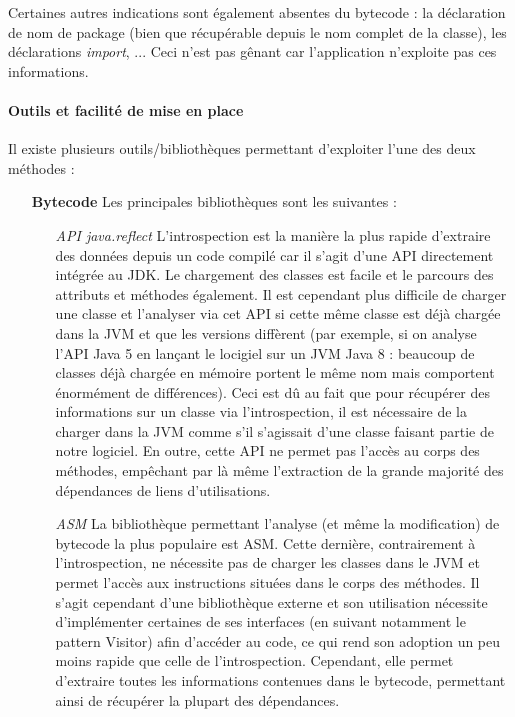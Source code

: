 \documentclass{scrartcl}
\begin{document}
    Certaines autres indications sont également absentes du bytecode : la déclaration de nom de package (bien que récupérable depuis le nom complet de la classe), les déclarations \textit{import}, ... Ceci n'est pas gênant car l'application n'exploite pas ces informations.
    
    \paragraph{Outils et facilité de mise en place} Il existe plusieurs outils/bibliothèques permettant d'exploiter l'une des deux méthodes :
        \bigbreak
        \begin{itemize}
            \item[\textbf{Bytecode}] Les principales bibliothèques sont les suivantes :
            \begin{itemize}
                \smallbreak
                \item[\textit{API java.reflect}] L'introspection est la manière la plus rapide d'extraire des données depuis un code compilé car il s'agit d'une API directement intégrée au JDK. Le chargement des classes est facile et le parcours des attributs et méthodes également. Il est cependant plus difficile de charger une classe et l'analyser via cet API si cette même classe est déjà chargée dans la JVM et que les versions diffèrent (par exemple, si on analyse l'API Java 5 en lançant le locigiel sur un JVM Java 8 : beaucoup de classes déjà chargée en mémoire portent le même nom mais comportent énormément de différences). Ceci est dû au fait que pour récupérer des informations sur un classe via l'introspection, il est nécessaire de la charger dans la JVM comme s'il s'agissait d'une classe faisant partie de notre logiciel. En outre, cette API ne permet pas l'accès au corps des méthodes, empêchant par là même l'extraction de la grande majorité des dépendances de liens d'utilisations.
                \smallbreak
                \item[\textit{ASM}\footnotemark] La bibliothèque permettant l'analyse (et même la modification) de bytecode la plus populaire est ASM. Cette dernière, contrairement à l'introspection, ne nécessite pas de charger les classes dans le JVM et permet l'accès aux instructions situées dans le corps des méthodes. Il s'agit cependant d'une bibliothèque externe et son utilisation nécessite d'implémenter certaines de ses interfaces (en suivant notamment le pattern Visitor) afin d'accéder au code, ce qui rend son adoption un peu moins rapide que celle de l'introspection. Cependant, elle permet d'extraire toutes les informations contenues dans le bytecode, permettant ainsi de récupérer la plupart des dépendances.

\end{itemize}
\end{itemize}
\end{document}
